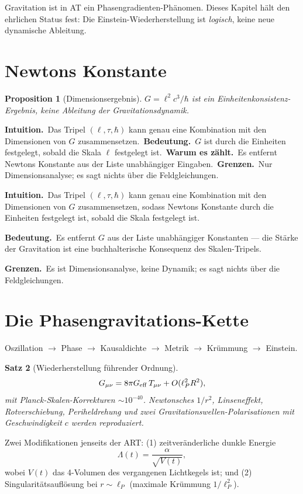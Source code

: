 \documentclass[10pt,twoside,openany]{book}
\newtheorem{theorem}{Satz}[chapter]
\newtheorem{proposition}[theorem]{Proposition}
\newcommand{\theoremnotes}[3]{%
  \par\medskip\noindent
  \textbf{Intuition.}\ #1\par
  \textbf{Bedeutung.}\ #2\par
  \textbf{Grenzen.}\ #3\par}
\newcommand{\eqnotes}[4]{%
  \par\smallskip\noindent
  \textbf{Intuition.}\ #1\ 
  \textbf{Bedeutung.}\ #2\ 
  \textbf{Warum es zählt.}\ #3\ 
  \textbf{Grenzen.}\ #4\par}
\begin{document}
Gravitation ist in AT ein Phasengradienten-Phänomen. Dieses Kapitel hält den ehrlichen
Status fest: Die Einstein-Wiederherstellung ist \emph{logisch}, keine neue dynamische
Ableitung.

\section{Newtons Konstante}

\begin{proposition}[Dimensionsergebnis]
$G = \ell^2 c^3/\hbar$ ist ein \emph{Einheitenkonsistenz}-Ergebnis, keine Ableitung der
Gravitationsdynamik.
\end{proposition}

\eqnotes
{Das Tripel $(\ell,\tau,\hbar)$ kann genau eine Kombination mit den Dimensionen von $G$
zusammensetzen.}
{$G$ ist durch die Einheiten festgelegt, sobald die Skala $\ell$ festgelegt ist.}
{Es entfernt Newtons Konstante aus der Liste unabhängiger Eingaben.}
{Nur Dimensionsanalyse; es sagt nichts über die Feldgleichungen.}

\theoremnotes
{Das Tripel $(\ell,\tau,\hbar)$ kann genau eine Kombination mit den Dimensionen von $G$
zusammensetzen, sodass Newtons Konstante durch die Einheiten festgelegt ist, sobald die
Skala festgelegt ist.}
{Es entfernt $G$ aus der Liste unabhängiger Konstanten --- die Stärke der Gravitation ist
eine buchhalterische Konsequenz des Skalen-Tripels.}
{Es ist Dimensionsanalyse, keine Dynamik; es sagt nichts über die Feldgleichungen.}

\section{Die Phasengravitations-Kette}

Oszillation $\to$ Phase $\to$ Kausaldichte $\to$ Metrik $\to$ Krümmung $\to$ Einstein.

\begin{theorem}[Wiederherstellung führender Ordnung]
\begin{equation}
G_{\mu\nu} = 8\pi G_{\rm eff}\, T_{\mu\nu} + O(\ell_P^2 R^2),
\end{equation}
mit Planck-Skalen-Korrekturen $\sim10^{-40}$. Newtonsches $1/r^2$, Linseneffekt,
Rotverschiebung, Periheldrehung und zwei Gravitationswellen-Polarisationen mit
Geschwindigkeit $c$ werden reproduziert.
\end{theorem}

Zwei Modifikationen jenseits der ART: (1) zeitveränderliche dunkle Energie
\begin{equation}
\Lambda(t) = \frac{\alpha}{\sqrt{V(t)}},
\end{equation}
wobei $V(t)$ das 4-Volumen des vergangenen Lichtkegels ist; und (2)
Singularitätsauflösung bei $r\sim\ell_P$ (maximale Krümmung $1/\ell_P^2$).
\end{document}
